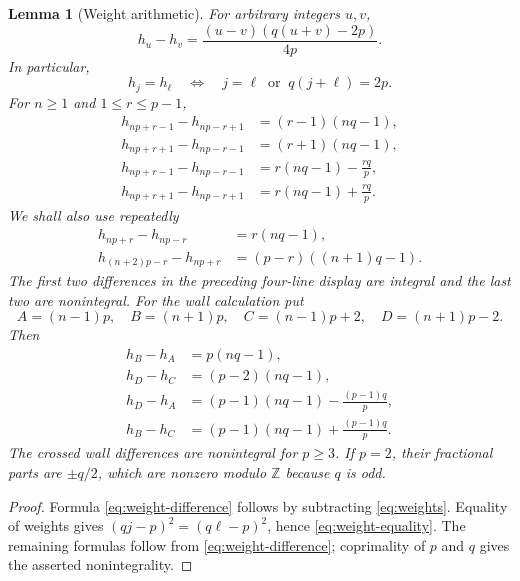 \documentclass[12pt,leqno]{amsart}
\numberwithin{equation}{section}
\newtheorem{lem}[thm]{Lemma}
\def\Z{\mathbb{Z}}
\begin{document}
\begin{lem}[Weight arithmetic]\label{lem:weight-arithmetic}
For arbitrary integers $u,v$,
\begin{equation}\label{eq:weight-difference}
 h_u-h_v=\frac{(u-v)(q(u+v)-2p)}{4p}.
\end{equation}
In particular,
\begin{equation}\label{eq:weight-equality}
 h_j=h_\ell
 \quad\Longleftrightarrow\quad
 j=\ell\ \text{ or }\ q(j+\ell)=2p.
\end{equation}
For $n\geq1$ and $1\leq r\leq p-1$,
\begin{align}
 h_{np+r-1}-h_{np-r+1}&=(r-1)(nq-1),\label{eq:parallel-one}\\
 h_{np+r+1}-h_{np-r-1}&=(r+1)(nq-1),\label{eq:parallel-two}\\
 h_{np+r-1}-h_{np-r-1}&=r(nq-1)-\frac{rq}{p},\label{eq:cross-one}\\
 h_{np+r+1}-h_{np-r+1}&=r(nq-1)+\frac{rq}{p}.\label{eq:cross-two}
\end{align}
We shall also use repeatedly
\begin{align}
 h_{np+r}-h_{np-r}&=r(nq-1),\label{eq:strip-central-difference}\\
 h_{(n+2)p-r}-h_{np+r}
   &=(p-r)((n+1)q-1).\label{eq:strip-upper-difference}
\end{align}
The first two differences in the preceding four-line display are integral
and the last two are nonintegral.
For the wall calculation put
\[
 A=(n-1)p,\quad B=(n+1)p,\quad C=(n-1)p+2,\quad D=(n+1)p-2.
\]
Then
\begin{align}
 h_B-h_A&=p(nq-1),\label{eq:wall-parallel-one}\\
 h_D-h_C&=(p-2)(nq-1),\label{eq:wall-parallel-two}\\
 h_D-h_A&=(p-1)(nq-1)-\frac{(p-1)q}{p},\label{eq:wall-cross-one}\\
 h_B-h_C&=(p-1)(nq-1)+\frac{(p-1)q}{p}.\label{eq:wall-cross-two}
\end{align}
The crossed wall differences are nonintegral for $p\geq3$.  If $p=2$,
their fractional parts are $\pm q/2$, which are nonzero modulo $\Z$
because $q$ is odd.
\end{lem}

\begin{proof}
Formula \eqref{eq:weight-difference} follows by subtracting
\eqref{eq:weights}.  Equality of weights gives
$(qj-p)^2=(q\ell-p)^2$, hence \eqref{eq:weight-equality}.  The remaining
formulas follow from \eqref{eq:weight-difference}; coprimality of $p$ and
$q$ gives the asserted nonintegrality.
\end{proof}
\end{document}
